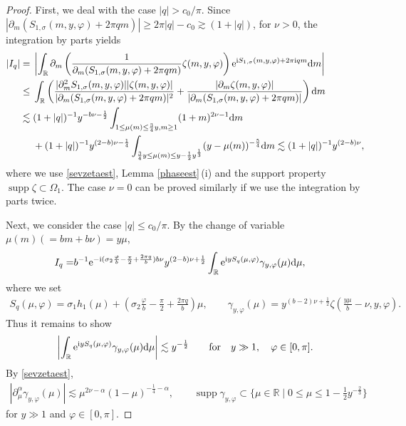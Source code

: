 \documentclass[pdftex]{sigma}
\numberwithin{equation}{section}
\def\R{\mathbb{R}}%
\DeclareMathOperator{\supp}{supp}%
\def\a{\alpha}
\def\c{\gamma}
\def\f{\varphi}
\def\m{\mu}
\def\n{\nu}
\def\s{\sigma}
\def\z{\zeta}
\def\pa{\partial}
\begin{document}
\begin{proof}
First, we deal with the case $|q|> c_0/\pi$. Since $|\pa_m(S_{1,\s}(m,y,\f)+2\pi qm)|\geq 2\pi|q|-c_0\gtrsim (1+|q|)$, for $\n>0$, the integration by parts yields
\begin{align*}
|I_{q}|={}&\left|\int_{\R}\pa_m\left(\frac{1}{\pa_m(S_{1,\s}(m,y,\f)+2\pi qm) } \z(m,y,\f)\right) {\rm e}^{{\rm i}S_{1,\s}(m,y,\f)+2\pi {\rm i}qm}{\rm d}m \right| \\
\leq{}&\int_{\R}\left(\frac{|\pa_m^2S_{1,\s}(m,y,\f)||\z(m,y,\f)|}{|\pa_m(S_{1,\s}(m,y,\f)+2\pi qm)|^2 } +\frac{|\pa_m\z(m,y,\f)|}{|\pa_m(S_{1,\s}(m,y,\f)+2\pi qm)|} \right) {\rm d}m \\
\lesssim{}& (1+|q|)^{-1} y^{-b\n-\frac{1}{2}}\int_{1\leq\m(m)\leq \frac{3}{4}y,m\geq 1}%
(1+m)^{2\n-1}{\rm d}m \\
&+(1+|q|)^{-1}y^{(2-b)\n-\frac{1}{4}}\int_{\frac{3}{4}y\leq\m(m)\leq y-\frac{1}{2}y^{\frac{1}{3}}}(y-\m(m))^{-\frac{5}{4}}{\rm d}m\lesssim (1+|q|)^{-1}y^{(2-b)\n},
\end{align*}
where we use \eqref{sevzetaest}, Lemma \ref{phaseest}\,(i) and the support property $\supp\z\subset \Omega_1$.
The case $\n=0$ can be proved similarly if we use the integration by parts twice.


Next, we consider the case $|q|\leq c_0/\pi$. By the change of variable $\m(m)(=bm+b\n)=y\m$,
\begin{align*}%
I_q=&b^{-1}{\rm e}^{-{\rm i}(\s_2\frac{\f}{b}-\frac{\pi}{2}+\frac{2\pi q}{b})b\n} y^{(2-b)\n+\frac{1}{2}}\int_{\R}{\rm e}^{{\rm i}yS_q(\m,\f) }\c_{y,\f}(\m) {\rm d}\m,
\end{align*}
where we set
\begin{align*}
S_q(\m,\f)=\s_1h_1(\m) +\left(\s_2\frac{\f}{b}-\frac{\pi}{2}+\frac{2\pi q}{b}\right)\m,\qquad \c_{y,\f}(\m)=y^{(b-2)\n+\frac{1}{2}}\z\left(\frac{y\m}{b}-\n,y,\f\right).
\end{align*}
Thus it remains to show
\begin{align}\label{I_1stphase}
\left|\int_{\R}{\rm e}^{{\rm i}yS_q(\m,\f) }\c_{y,\f}(\m) {\rm d}\m\right|\lesssim y^{-\frac{1}{2}}\qquad \text{for}\quad y\gg 1,\quad \f\in [0,\pi].
\end{align}
By \eqref{sevzetaest},
\begin{align*}%
|\pa_\m^{\a}\c_{y,\f}(\m)|\lesssim \m^{2\n-\a}(1-\m)^{-\frac{1}{4}-\a},\qquad \supp \c_{y,\f}\subset \big\{\m\in\R\mid 0\leq \m\leq 1-\frac{1}{2}y^{-\frac{2}{3}} \big\}
\end{align*}
for $y\gg 1$ and $\f\in [0,\pi]$.


\end{proof}
\end{document}
